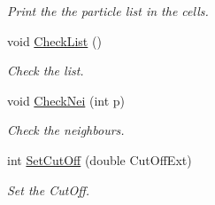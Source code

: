 \begin{DoxyCompactItemize}
\begin{DoxyCompactList}\small\item\em Print the the particle list in the cells. \end{DoxyCompactList}\item 
void \hyperlink{classDomDecBasics_a4e589206ab9bc4752d547111d6bba6e7}{Check\+List} ()\hypertarget{classDomDecBasics_a4e589206ab9bc4752d547111d6bba6e7}{}\label{classDomDecBasics_a4e589206ab9bc4752d547111d6bba6e7}

\begin{DoxyCompactList}\small\item\em Check the list. \end{DoxyCompactList}\item 
void \hyperlink{classDomDecBasics_ad6d4b1b657a39ed64c2c45d4706dbcc1}{Check\+Nei} (int p)\hypertarget{classDomDecBasics_ad6d4b1b657a39ed64c2c45d4706dbcc1}{}\label{classDomDecBasics_ad6d4b1b657a39ed64c2c45d4706dbcc1}

\begin{DoxyCompactList}\small\item\em Check the neighbours. \end{DoxyCompactList}\item 
int \hyperlink{classDomDecBasics_aa1b1f1f1104d2124962ffbdec630f830}{Set\+Cut\+Off} (double Cut\+Off\+Ext)
\begin{DoxyCompactList}\small\item\em Set the Cut\+Off. \end{DoxyCompactList}\end{DoxyCompactItemize}

